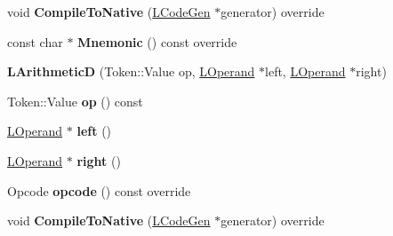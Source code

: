 \begin{DoxyCompactItemize}
\item 
void {\bfseries Compile\+To\+Native} (\hyperlink{classv8_1_1internal_1_1_l_code_gen}{L\+Code\+Gen} $\ast$generator) override\hypertarget{classv8_1_1internal_1_1_l_arithmetic_d_a87834ef9f5e37f8ade4c8e8ef4284572}{}\label{classv8_1_1internal_1_1_l_arithmetic_d_a87834ef9f5e37f8ade4c8e8ef4284572}

\item 
const char $\ast$ {\bfseries Mnemonic} () const  override\hypertarget{classv8_1_1internal_1_1_l_arithmetic_d_a401c29ddc6c8aa2dc41d23d4be14aff7}{}\label{classv8_1_1internal_1_1_l_arithmetic_d_a401c29ddc6c8aa2dc41d23d4be14aff7}

\item 
{\bfseries L\+ArithmeticD} (Token\+::\+Value op, \hyperlink{classv8_1_1internal_1_1_l_operand}{L\+Operand} $\ast$left, \hyperlink{classv8_1_1internal_1_1_l_operand}{L\+Operand} $\ast$right)\hypertarget{classv8_1_1internal_1_1_l_arithmetic_d_aad5c45947dcad72abbbcd55b081f4e6e}{}\label{classv8_1_1internal_1_1_l_arithmetic_d_aad5c45947dcad72abbbcd55b081f4e6e}

\item 
Token\+::\+Value {\bfseries op} () const \hypertarget{classv8_1_1internal_1_1_l_arithmetic_d_a0689ba0a4deee0bb4450bb0fdc7f877b}{}\label{classv8_1_1internal_1_1_l_arithmetic_d_a0689ba0a4deee0bb4450bb0fdc7f877b}

\item 
\hyperlink{classv8_1_1internal_1_1_l_operand}{L\+Operand} $\ast$ {\bfseries left} ()\hypertarget{classv8_1_1internal_1_1_l_arithmetic_d_a8d143eb5deb9725b2544b7ecc1a6b7aa}{}\label{classv8_1_1internal_1_1_l_arithmetic_d_a8d143eb5deb9725b2544b7ecc1a6b7aa}

\item 
\hyperlink{classv8_1_1internal_1_1_l_operand}{L\+Operand} $\ast$ {\bfseries right} ()\hypertarget{classv8_1_1internal_1_1_l_arithmetic_d_ad78701fa7af5138fc5a741a1ceed96a7}{}\label{classv8_1_1internal_1_1_l_arithmetic_d_ad78701fa7af5138fc5a741a1ceed96a7}

\item 
Opcode {\bfseries opcode} () const  override\hypertarget{classv8_1_1internal_1_1_l_arithmetic_d_a6371d86c37944a1a90b2e4778d0b7024}{}\label{classv8_1_1internal_1_1_l_arithmetic_d_a6371d86c37944a1a90b2e4778d0b7024}

\item 
void {\bfseries Compile\+To\+Native} (\hyperlink{classv8_1_1internal_1_1_l_code_gen}{L\+Code\+Gen} $\ast$generator) override\hypertarget{classv8_1_1internal_1_1_l_arithmetic_d_a87834ef9f5e37f8ade4c8e8ef4284572}{}\label{classv8_1_1internal_1_1_l_arithmetic_d_a87834ef9f5e37f8ade4c8e8ef4284572}


\end{DoxyCompactItemize}
